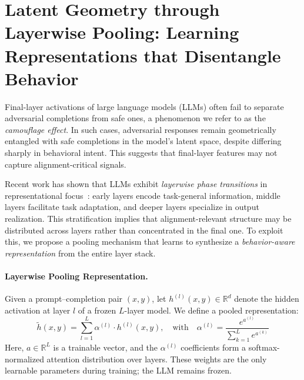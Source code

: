 \section{Latent Geometry through Layerwise Pooling: Learning Representations that Disentangle Behavior}
\label{sec:pool_profile}

Final-layer activations of large language models (LLMs) often fail to separate adversarial completions from safe ones, a phenomenon we refer to as the \textit{camouflage effect}. In such cases, adversarial responses remain geometrically entangled with safe completions in the model’s latent space, despite differing sharply in behavioral intent. This suggests that final-layer features may not capture alignment-critical signals.

Recent work has shown that LLMs exhibit \textit{layerwise phase transitions} in representational focus~\cite{liu2023lost,belrose2023language}: early layers encode task-general information, middle layers facilitate task adaptation, and deeper layers specialize in output realization. This stratification implies that alignment-relevant structure may be distributed across layers rather than concentrated in the final one. To exploit this, we propose a pooling mechanism that learns to synthesize a \textit{behavior-aware representation} from the entire layer stack.

\vspace{1mm}
\paragraph{Layerwise Pooling Representation.} Given a prompt–completion pair \((x, y)\), let \(h^{(l)}(x, y) \in \mathbb{R}^d\) denote the hidden activation at layer \(l\) of a frozen \(L\)-layer model. We define a pooled representation:
\[
\tilde{h}(x, y) = \sum_{l=1}^{L} \alpha^{(l)} \cdot h^{(l)}(x, y), \quad \text{with} \quad \alpha^{(l)} = \frac{e^{a^{(l)}}}{\sum_{k=1}^{L} e^{a^{(k)}}}
\]
Here, \(a \in \mathbb{R}^L\) is a trainable vector, and the \(\alpha^{(l)}\) coefficients form a softmax-normalized attention distribution over layers. These weights are the only learnable parameters during training; the LLM remains frozen.

\vspace{1mm}
